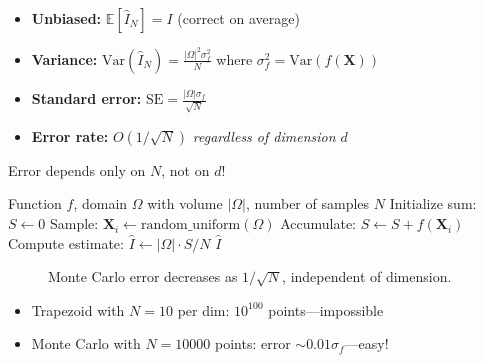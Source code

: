\begin{itemize}
    \item \textbf{Unbiased:} $\mathbb{E}[\hat{I}_N] = I$ (correct on average)
    \item \textbf{Variance:} $\text{Var}(\hat{I}_N) = \frac{|\Omega|^2 \sigma_f^2}{N}$ where $\sigma_f^2 = \text{Var}(f(\mathbf{X}))$
    \item \textbf{Standard error:} $\text{SE} = \frac{|\Omega| \sigma_f}{\sqrt{N}}$
    \item \textbf{Error rate:} $O(1/\sqrt{N})$ \emph{regardless of dimension $d$}
\end{itemize}

 Error depends only on $N$, not on $d$!

\begin{algorithm}[H]
\caption{Monte Carlo Integration}
\begin{algorithmic}[1]
    \Require Function $f$, domain $\Omega$ with volume $|\Omega|$, number of samples $N$
    \State Initialize sum: $S \gets 0$
        \State Sample: $\mathbf{X}_i \gets \text{random\_uniform}(\Omega)$
        \State Accumulate: $S \gets S + f(\mathbf{X}_i)$
    \EndFor
    \State Compute estimate: $\hat{I} \gets |\Omega| \cdot S / N$
    \Return $\hat{I}$
\end{algorithmic}
\end{algorithm}

\begin{figure}[h]
    \centering
    \caption{Monte Carlo error decreases as $1/\sqrt{N}$, independent of dimension.}
    \label{fig:mc_error}
\end{figure}

\begin{itemize}
    \item Trapezoid with $N = 10$ per dim: $10^{100}$ points---impossible
    \item Monte Carlo with $N = 10000$ points: error $\sim 0.01 \sigma_f$---easy!
\end{itemize}


